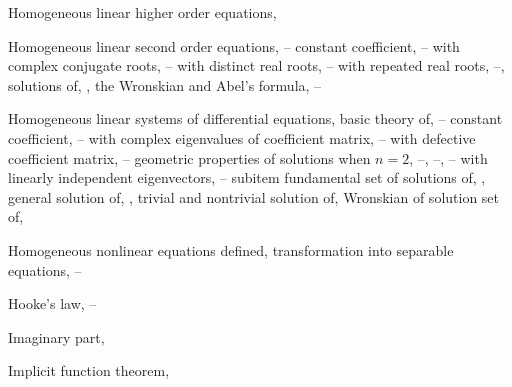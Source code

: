 \begin{theindex}
  \item Homogeneous linear higher order equations, \pageref{thmtype:9.1.1}

  \item Homogeneous linear second order equations, \pageref{eq:5.1.1}--\pageref{eq:5.3.1}
    \subitem constant coefficient, \pageref{eq:5.2.1}--\pageref{eq:5.3.1}
      \subsubitem with complex conjugate roots, \pageref{eq:5.2.14}--\pageref{thmtype:5.2.1}
      \subsubitem with distinct real roots, \pageref{eq:5.2.1}--\pageref{thmtype:5.2.1}
      \subsubitem with repeated real roots, \pageref{eq:5.2.1}--\pageref{eq:5.2.13}, \pageref{thmtype:5.2.1}
    \subitem solutions of, \pageref{thmtype:5.1.1}, \pageref{thmtype:5.1.2}
    \subitem the Wronskian and Abel's formula, \pageref{eq:5.1.21}--\pageref{thmtype:5.1.6}

  \item Homogeneous linear systems of differential equations, \pageref{eq:10.2.2}
    \subitem basic theory of, \pageref{eq:10.3.1}--\pageref{exer:10.3.13}
    \subitem constant coefficient, \pageref{eq:10.4.1}--\pageref{exer:10.6.40}
      \subsubitem with complex eigenvalues of coefficient matrix, \pageref{eq:10.6.1}--\pageref{exer:10.6.40}
      \subsubitem with defective coefficient matrix, \pageref{eq:10.5.1}--\pageref{eq:10.5.19}
      \subsubitem geometric properties of solutions when $n=2$, \pageref{eq:10.4.1}--\pageref{exer:10.4.1}, \pageref{eq:10.5.19}--\pageref{exer:10.5.1}, \pageref{eq:10.6.10}--\pageref{exer:10.6.1}
      \subsubitem with linearly independent eigenvectors, \pageref{eq:10.4.1}--\pageref{exer:10.4.1} subitem fundamental set of solutions of, \pageref{eq:10.3.1}, \pageref{thmtype:10.3.3}
    \subitem general solution of, \pageref{eq:10.3.1}, \pageref{thmtype:10.3.3}
    \subitem trivial and nontrivial solution of, \pageref{eq:10.3.1}
    \subitem Wronskian of solution set of, \pageref{thmtype:10.3.2}

  \item Homogeneous nonlinear equations
    \subitem defined, \pageref{eq:2.4.7}
    \subitem transformation into separable equations, \pageref{eq:2.4.7}--\pageref{exer:2.4.1}

  \item Hooke's law, \pageref{eq:6.1.1}--\pageref{eq:6.1.2} 

  \item Imaginary part, \pageref{eq:5.2.17}

  \item Implicit function theorem, \pageref{thmtype:2.2.1}


\end{theindex}
